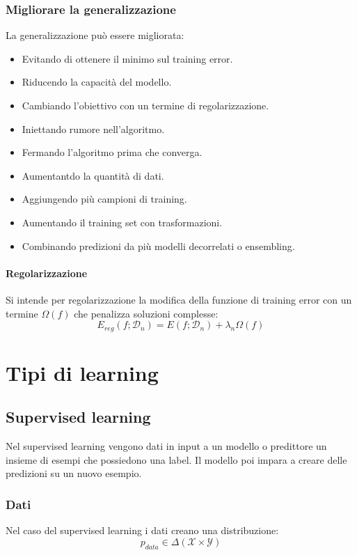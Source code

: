 		\subsubsection{Migliorare la generalizzazione}
		La generalizzazione pu\`o essere migliorata:
		\begin{multicols}{2}
			\begin{itemize}
				\item Evitando di ottenere il minimo sul training error.
				\item Riducendo la capacit\`a del modello.
				\item Cambiando l'obiettivo con un termine di regolarizzazione.
				\item Iniettando rumore nell'algoritmo.
				\item Fermando l'algoritmo prima che converga.
				\item Aumentantdo la quantit\`a di dati.
				\item Aggiungendo pi\`u campioni di training.
				\item Aumentando il training set con trasformazioni.
				\item Combinando predizioni da pi\`u modelli decorrelati o ensembling.
			\end{itemize}
		\end{multicols}

			\paragraph{Regolarizzazione}
			Si intende per regolarizzazione la modifica della funzione di training error con un termine $\Omega(f)$ che penalizza soluzioni complesse:
			$$E_{reg}(f;\mathcal{D}_n)=E(f;\mathcal{D}_n)+\lambda_n\Omega(f)$$


\section{Tipi di learning}

	\subsection{Supervised learning}
	Nel supervised learning vengono dati in input a un modello o predittore un insieme di esempi che possiedono una label.
	Il modello poi impara a creare delle predizioni su un nuovo esempio.

		\subsubsection{Dati}
		Nel caso del supervised learning i dati creano una distribuzione:
		$$p_{data}\in\Delta(\mathcal{X}\times\mathcal{Y})$$

